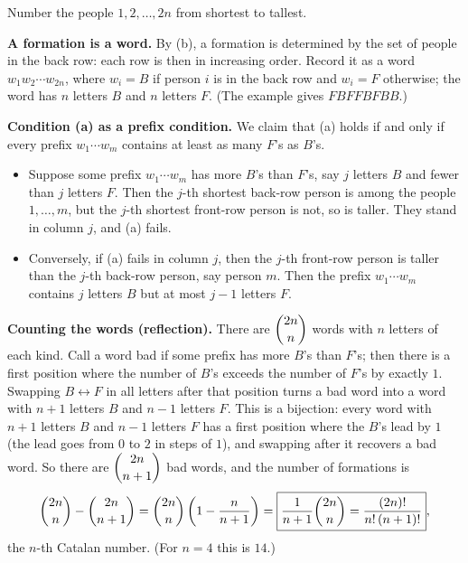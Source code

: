 Number the people $1,2,\dots,2n$ from shortest to tallest.

\textbf{A formation is a word.} By (b), a formation is determined by the set of people in the back row: each row is then in increasing order. Record it as a word $w_1w_2\cdots w_{2n}$, where $w_i=B$ if person $i$ is in the back row and $w_i=F$ otherwise; the word has $n$ letters $B$ and $n$ letters $F$. (The example gives $FBFFBFBB$.)

\textbf{Condition (a) as a prefix condition.} We claim that (a) holds if and only if every prefix $w_1\cdots w_m$ contains at least as many $F$'s as $B$'s.
\begin{itemize}
\item Suppose some prefix $w_1\cdots w_m$ has more $B$'s than $F$'s, say $j$ letters $B$ and fewer than $j$ letters $F$. Then the $j$-th shortest back-row person is among the people $1,\dots,m$, but the $j$-th shortest front-row person is not, so is taller. They stand in column $j$, and (a) fails.
\item Conversely, if (a) fails in column $j$, then the $j$-th front-row person is taller than the $j$-th back-row person, say person $m$. Then the prefix $w_1\cdots w_m$ contains $j$ letters $B$ but at most $j-1$ letters $F$.
\end{itemize}

\textbf{Counting the words (reflection).} There are $\dbinom{2n}{n}$ words with $n$ letters of each kind. Call a word bad if some prefix has more $B$'s than $F$'s; then there is a first position where the number of $B$'s exceeds the number of $F$'s by exactly $1$. Swapping $B\leftrightarrow F$ in all letters after that position turns a bad word into a word with $n+1$ letters $B$ and $n-1$ letters $F$. This is a bijection: every word with $n+1$ letters $B$ and $n-1$ letters $F$ has a first position where the $B$'s lead by $1$ (the lead goes from $0$ to $2$ in steps of $1$), and swapping after it recovers a bad word. So there are $\dbinom{2n}{n+1}$ bad words, and the number of formations is
\[\dbinom{2n}{n}-\dbinom{2n}{n+1}=\dbinom{2n}{n}\left(1-\dfrac{n}{n+1}\right)=\boxed{\dfrac{1}{n+1}\dbinom{2n}{n}=\dfrac{(2n)!}{n!\,(n+1)!}},\]
the $n$-th Catalan number. (For $n=4$ this is $14$.)
